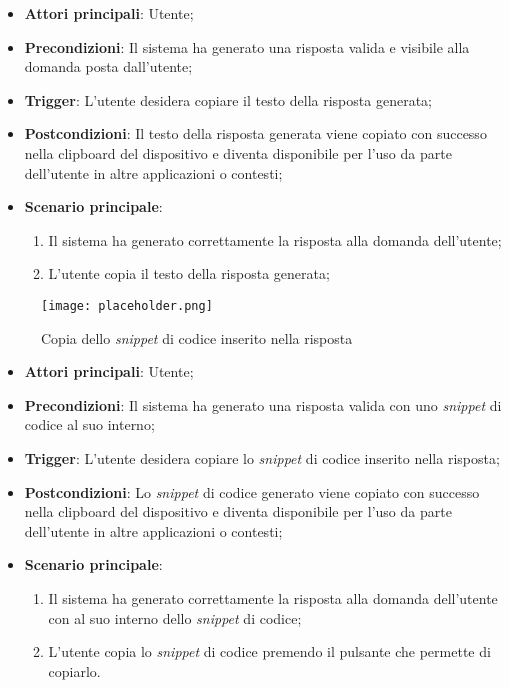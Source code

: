 \begin{itemize}
    \item \textbf{Attori principali}: Utente;
    \item \textbf{Precondizioni}: Il sistema ha generato una risposta valida e visibile alla domanda posta dall'utente;
    \item \textbf{Trigger}: L'utente desidera copiare il testo della risposta generata;
    \item \textbf{Postcondizioni}: Il testo della risposta generata viene copiato con successo nella clipboard del dispositivo e diventa disponibile per l'uso da parte dell'utente in altre applicazioni o contesti;
    \item \textbf{Scenario principale}:
    \begin{enumerate}
        \item Il sistema ha generato correttamente la risposta alla domanda dell'utente;
        \item L'utente copia il testo della risposta generata;
    \end{enumerate}
\end{itemize}


\hypertarget{UC8}{}

\begin{figure}[h]
    \centering
    \texttt{[image: placeholder.png]}
    \caption{Copia dello \emph{snippet} di codice inserito nella risposta}
\end{figure}

\begin{itemize}
    \item \textbf{Attori principali}: Utente;
    \item \textbf{Precondizioni}: Il sistema ha generato una risposta valida con uno \emph{snippet} di codice al suo interno;
    \item \textbf{Trigger}: L'utente desidera copiare lo \emph{snippet} di codice inserito nella risposta;
    \item \textbf{Postcondizioni}: Lo \emph{snippet} di codice generato viene copiato con successo nella clipboard del dispositivo e diventa disponibile per l'uso da parte dell'utente in altre applicazioni o contesti;
    \item \textbf{Scenario principale}:
    \begin{enumerate}
        \item Il sistema ha generato correttamente la risposta alla domanda dell'utente con al suo interno dello \emph{snippet} di codice;
        \item L'utente copia lo \emph{snippet} di codice premendo il pulsante che permette di copiarlo.
    \end{enumerate}
\end{itemize}



